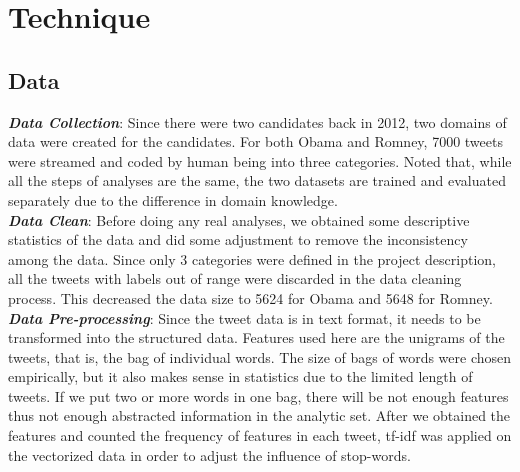 \documentclass[paper=a4, fontsize=12pt]{scrartcl}
\numberwithin{equation}{section}
\numberwithin{figure}{section}
\numberwithin{table}{section}
\begin{document}
\section{Technique}
\subsection{Data}
\textit{\textbf{Data Collection}}: Since there were two candidates back in 2012, two domains of data were created for the candidates. For both Obama and Romney, 7000 tweets were streamed and coded by human being into three categories. Noted that, while all the steps of analyses are the same, the two datasets are trained and evaluated separately due to the difference in domain knowledge. \\[5pt]
\textit{\textbf{Data Clean}}: Before doing any real analyses, we obtained some descriptive statistics of the data and did some adjustment to remove the inconsistency among the data. Since only 3 categories were defined in the project description, all the tweets with labels out of range were discarded in the data cleaning process. This decreased the data size to 5624 for Obama and 5648 for Romney. \\[5pt]
\textit{\textbf{Data Pre-processing}}: Since the tweet data is in text format, it needs to be transformed into the structured data. Features used here are the unigrams of the tweets, that is, the bag of individual words. The size of bags of words were chosen empirically, but it also makes sense in statistics due to the limited length of tweets. If we put two or more words in one bag, there will be not enough features thus not enough abstracted information in the analytic set. After we obtained the features and counted the frequency of features in each tweet, tf-idf was applied on the vectorized data in order to adjust the influence of stop-words.
\end{document}
